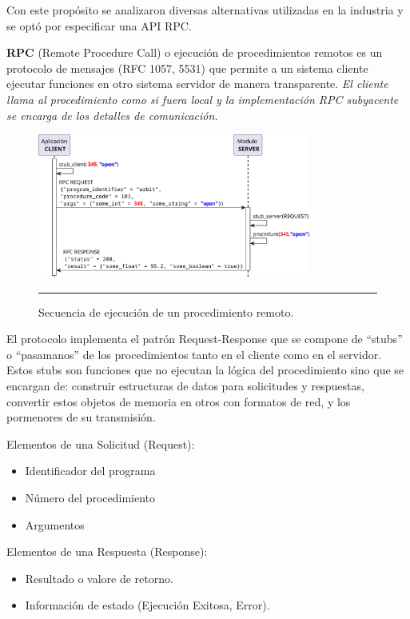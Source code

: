 Con este propósito se analizaron diversas alternativas utilizadas en la industria y se optó por especificar una API RPC.

\textbf{RPC} (Remote Procedure Call) o ejecución de procedimientos remotos es un protocolo de mensajes (RFC 1057, 5531) que permite a un sistema cliente ejecutar funciones en otro sistema servidor de manera transparente. 
\emph{El cliente llama al procedimiento como si fuera local y la implementación RPC subyacente se encarga de los detalles de comunicación.}

\begin{figure}[htbp]
	\centering
	\includegraphics[width=0.8\textwidth]{Figures/design/SEQ_rpc_ink.png}
	\rule{35em}{1pt}
	\caption[Secuencia RPC]{Secuencia de ejecución de un procedimiento remoto.}
	\label{fig:seq_rpc}
\end{figure}

El protocolo implementa el patrón Request-Response que se compone de ``stubs'' o ``pasamanos'' de los procedimientos tanto en el cliente como en el servidor. Estos stubs son funciones que no ejecutan la lógica del procedimiento sino que se encargan de: construir estructuras de datos para solicitudes y respuestas, convertir estos objetos de memoria en otros con formatos de red, y los pormenores de su transmisión.


Elementos de una Solicitud (Request):
\begin{itemize}
	\item Identificador del programa
	\item Número del procedimiento
	\item Argumentos
\end{itemize}

Elementos de una Respuesta (Response):
\begin{itemize}
	\item Resultado o valore de retorno.
	\item Información de estado (Ejecución Exitosa, Error).
\end{itemize}

